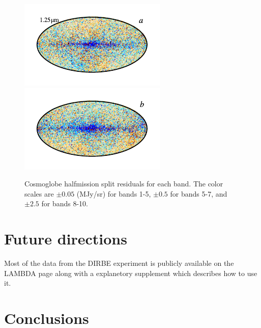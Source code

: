 \documentclass{aa}
\begin{document}
\begin{figure}
	\includegraphics{figs/res_maps/res_01a_c0001_000019.pdf}\includegraphics{figs/res_maps/res_01b_c0001_000019.pdf}
  \vspace*{-0.85cm}

	\caption{Cosmoglobe halfmission split residuals for each band. The color scales are $\pm 0.05$ (MJy/sr) for bands 1-5, $\pm 0.5$ for bands 5-7, and $\pm 2.5$ for bands 8-10.}
	\label{fig:res}
\end{figure}



\clearpage
\section{Future directions}
Most of the data from the DIRBE experiment is publicly available on the LAMBDA page along with a explanetory supplement which describes how to use it.


\clearpage
\section{Conclusions}
\end{document}
